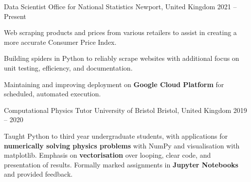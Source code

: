 
\begin{cventries}

    \cventry
        {Data Scientist} %
        {Office for National Statistics} %
        {Newport, United Kingdom} %
        {2021 -- Present} %
        {
            \begin{cvitems} %
                \item{Web scraping products and prices from various retailers to assist in creating a more accurate Consumer Price Index.}
                \item{Building spiders in Python to reliably scrape websites with additional focus on unit testing, efficiency, and documentation.}
                \item{Maintaining and improving deployment on \textbf{Google Cloud Platform} for scheduled, automated execution.}
            \end{cvitems}
        }

    \cventry
        {Computational Physics Tutor} %
        {University of Bristol} %
        {Bristol, United Kingdom} %
        {2019 -- 2020} %
        {
            \begin{cvitems} %
                \item{Taught Python to third year undergraduate students, with applications for \textbf{numerically solving physics problems} with NumPy and visualisation with matplotlib. Emphasis on \textbf{vectorisation} over looping, clear code, and presentation of results. Formally marked assignments in \textbf{Jupyter Notebooks} and provided feedback.}
            \end{cvitems}
        }


\end{cventries}
